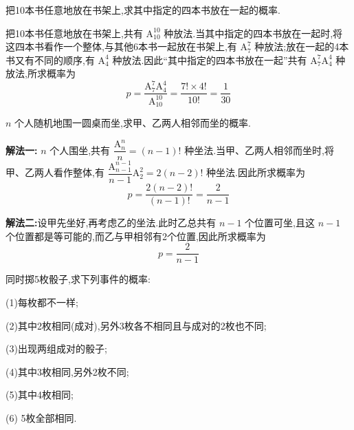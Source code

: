\question 把10本书任意地放在书架上,求其中指定的四本书放在一起的概率.

\begin{solution}
    把10本书任意地放在书架上,共有 $\mathrm{A}_{10}^{10}$ 种放法.当其中指定的四本书放在一起时,将这四本书看作一个整体,与其他6本书一起放在书架上,有 $\mathrm{A}_7^7$ 种放法;放在一起的4本书又有不同的顺序,有 $\mathrm{A}_4^4$ 种放法.因此``其中指定的四本书放在一起''共有 $\mathrm{A}_7^7 \mathrm{A}_4^4$ 种放法,所求概率为
    $$
    p = \dfrac{\mathrm{A}_7^7 \mathrm{A}_4^4}{\mathrm{A}_{10}^{10}} = \dfrac{7! \times 4!}{10!} = \dfrac{1}{30}
    $$
\end{solution}

\question $n$ 个人随机地围一圆桌而坐,求甲、乙两人相邻而坐的概率.

\begin{solution}

    \textbf{解法一:} $n$ 个人围坐,共有 $\dfrac{\mathrm{A}_n^n}{n} = (n-1)!$ 种坐法.当甲、乙两人相邻而坐时,将甲、乙两人看作整体,有 $\dfrac{\mathrm{A}_{n-1}^{n-1}}{n-1} \mathrm{A}_2^2 = 2(n-2)!$ 种坐法.因此所求概率为
    $$
    p = \dfrac{2(n-2)!}{(n-1)!} = \dfrac{2}{n-1}
    $$

    \textbf{解法二:}设甲先坐好,再考虑乙的坐法.此时乙总共有 $n-1$ 个位置可坐,且这 $n-1$ 个位置都是等可能的,而乙与甲相邻有2个位置,因此所求概率为
    $$
    p = \dfrac{2}{n-1}
    $$
\end{solution}

\question 同时掷5枚骰子,求下列事件的概率:

(1)每枚都不一样;

(2)其中2枚相同(成对),另外3枚各不相同且与成对的2枚也不同;

(3)出现两组成对的骰子;

(4)其中3枚相同,另外2枚不同;

(5)其中4枚相同;

(6) 5枚全部相同.


